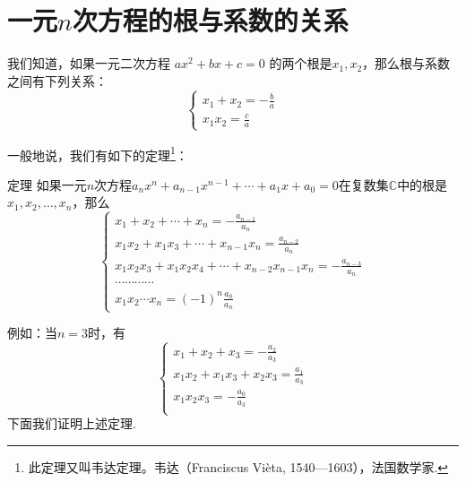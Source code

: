 \section{一元$n$次方程的根与系数的关系}
我们知道，如果一元二次方程
$ax^2+bx+c=0$
的两个根是$x_1,x_2$，那么根与系数之间有下列关系：
\[\begin{cases}
    x_1+x_2=-\frac{b}{a}\\
    x_1x_2=\frac{c}{a}
\end{cases}\]

一般地说，我们有如下的定理\footnote{此定理又叫韦达定理。韦达（Franciscus Vi\`{e}ta, 1540—1603），法国数学家.}：

\begin{thm}{定理}
如果一元$n$次方程$a_nx^n+a_{n-1}x^{n-1}+\cdots+a_1 x+a_0=0$在复数集$\mathbb{C}$中的根是$x_1,x_2,\ldots, x_n$，那么
\begin{equation}
\begin{cases}
x_1+x_2+\cdots+x_n=-\frac{a_{n-1}}{a_n}\\
x_1x_2+x_1x_3+\cdots+x_{n-1}x_n=\frac{a_{n-2}}{a_n}\\
x_1x_2x_3+x_1x_2x_4+\cdots+x_{n-2}x_{n-1}x_n=-\frac{a_{n-3}}{a_n}\\
\cdots\cdots\cdots\cdots\\
x_1x_2\cdots x_n=(-1)^n \frac{a_0}{a_n}
\end{cases}    \tag{*}
\end{equation}
\end{thm}

例如：当$n=3$时，有
\[\begin{cases}
    x_1+x_2+x_3=-\frac{a_2}{a_3}\\
    x_1x_2+x_1x_3+x_2x_3=\frac{a_1}{a_3}\\
    x_1x_2x_3=-\frac{a_0}{a_3}\\
\end{cases}\]
下面我们证明上述定理.

